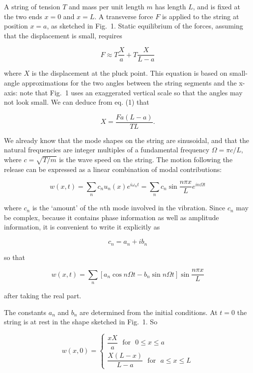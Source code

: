   A string of tension $T$ and mass per unit length $m$ has length $L$, and is 
  fixed at the two ends $x=0$ and $x=L$. A transverse force $F$ is applied to 
  the string at position $x=a$, as sketched in Fig.\ 1. Static equilibrium of 
  the forces, assuming that the displacement is small, requires 

  $$F \approx T \dfrac{X}{a}+ T \dfrac{X}{L-a} \tag{1}$$ 

  where $X$ is the displacement at the pluck point. This equation is based on 
  small-angle approximations for the two angles between the string segments and 
  the x-axis: note that Fig.\ 1 uses an exaggerated vertical scale so that the 
  angles may not look small. We can deduce from eq. (1) that 

  $$X=\dfrac{Fa(L-a)}{TL}. \tag{2}$$ 


  We already know that the mode shapes on the string are sinusoidal, and that 
  the natural frequencies are integer multiples of a fundamental frequency 
  $\Omega = \pi c/L$, where $c=\sqrt{T/m}$ is the wave speed on the string. The 
  motion following the release can be expressed as a linear combination of 
  modal contributions: 

  $$w(x,t)=\sum_n{c_n u_n(x) e^{i \omega_n t}}=\sum_n{c_n \sin \dfrac{n \pi 
  x}{L} e^{in \Omega t}} \tag{3}$$ 

  where $c_n$ is the `amount' of the $n$th mode involved in the vibration. 
  Since $c_n$ may be complex, because it contains phase information as well as 
  amplitude information, it is convenient to write it explicitly as 

  $$c_n=a_n +i b_n \tag{4}$$ 

  so that 

  $$w(x,t)=\sum_n{\left[ a_n \cos n \Omega t -b_n \sin n \Omega t \right] \sin 
  \dfrac{n \pi x}{L}} \tag{5}$$ 

  after taking the real part. 

  The constants $a_n$ and $b_n$ are determined from the initial conditions. At 
  $t=0$ the string is at rest in the shape sketched in Fig.\ 1. So 

  $$w(x,0) = \left\{ \begin{array}{ll} \dfrac{xX}{a} \mathrm{~~~for~~~} 0\le 
  x\le a \\ \dfrac{X(L-x)}{L-a} \mathrm{~~~for~~~} a\le x\le L \end{array} 
  \right. \tag{6}$$ 

